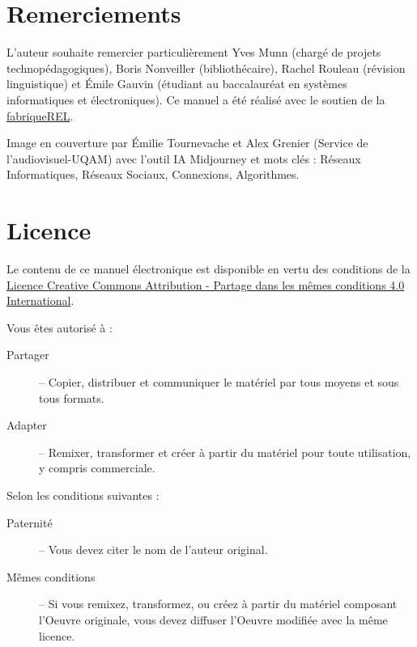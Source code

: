 \documentclass[letter, oneside]{book}
\begin{document}
\section*{Remerciements}
\label{sec:orge9be06d}

L'auteur souhaite remercier particulièrement Yves Munn (chargé de
projets technopédagogiques), Boris Nonveiller (bibliothécaire), Rachel
Rouleau (révision linguistique) et Émile Gauvin (étudiant au
baccalauréat en systèmes informatiques et électroniques). Ce manuel a
été réalisé avec le soutien de la \href{https://fabriquerel.org/}{fabriqueREL}.

Image en couverture par Émilie Tournevache et Alex Grenier (Service de
l'audiovisuel-UQAM) avec l'outil IA Midjourney et mots clés : Réseaux
Informatiques, Réseaux Sociaux, Connexions, Algorithmes.

\section*{Licence}
\label{sec:org7ad60d5}

\begin{center}
\href{https://creativecommons.org/licenses/by/4.0/deed.fr}{} 
\end{center}


Le contenu de ce manuel électronique est disponible en vertu des
conditions de la \href{https://creativecommons.org/licenses/by-sa/4.0/deed.fr}{Licence Creative Commons Attribution - Partage dans
les mêmes conditions 4.0 International}.

Vous êtes autorisé à : 

\begin{description}
\item[{Partager}] – Copier, distribuer et communiquer le matériel par tous
moyens et sous tous formats.
\item[{Adapter}] – Remixer, transformer et créer à partir du matériel pour
toute utilisation, y compris commerciale.
\end{description}

Selon les conditions suivantes :

\begin{description}
\item[{Paternité}] – Vous devez citer le nom de l'auteur original.
\item[{Mêmes conditions}] – Si vous remixez, transformez, ou créez à
partir du matériel composant l'Oeuvre originale, vous devez diffuser
l'Oeuvre modifiée avec la même licence.
\end{description}
\end{document}
